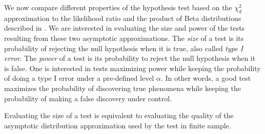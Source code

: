 
\begin{figure}
    \centering
\end{figure}

\cite{Tang2020}


\begin{figure}
    \centering
\end{figure}

\begin{figure}
    \centering
\end{figure}

\begin{figure}
    \centering
\end{figure}


We now compare different properties of the hypothesis test based on the $\chi^2_d$ approximation to the likelihood ratio and the product of Beta distributions described in . We are interested in evaluating the size and power of the tests resulting from these two asymptotic approximations. The \textit{size} of a test is its probability of rejecting the null hypothesis when it is true, also called \textit{type I error}. The \textit{power} of a test is its probability to reject the null hypothesis when it is false. One is interested in tests maximizing power while keeping the probability of doing a type I error under a pre-defined level $\alpha$. In other words, a good test maximizes the probability of discovering true phenomena while keeping the probability of making a false discovery under control.

Evaluating the size of a test is equivalent to evaluating the quality of the asymptotic distribution approximation used by the test in finite sample. 



